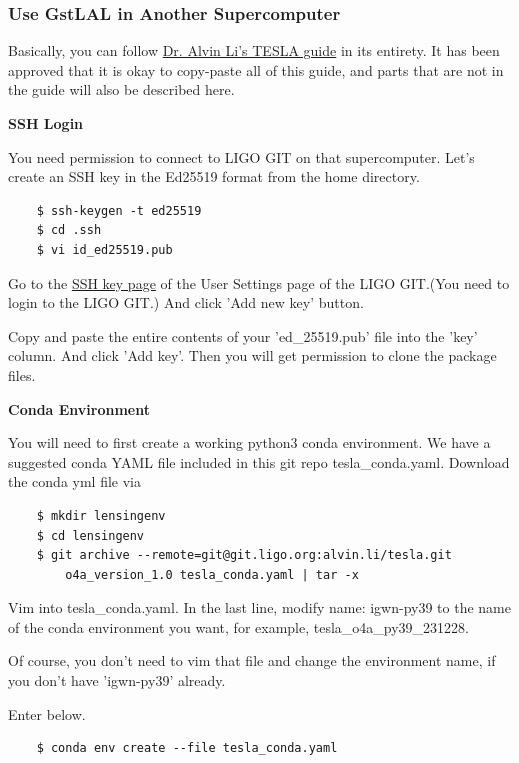 \subsubsection{Use GstLAL in Another Supercomputer}

Basically, you can follow \href{https://git.ligo.org/alvin.li/tesla/-/tree/o4a_version_1.0}{Dr. Alvin Li's TESLA guide} in its entirety. It has been approved that it is okay to copy-paste all of this guide, and parts that are not in the guide will also be described here.

\textbf{SSH Login}

You need permission to connect to LIGO GIT on that supercomputer. Let's create an SSH key in the Ed25519 format from the home directory.

\begin{verbatim}
    $ ssh-keygen -t ed25519
    $ cd .ssh
    $ vi id_ed25519.pub
\end{verbatim}

Go to the \href{https://git.ligo.org/-/user_settings/ssh_keys}{SSH key page} of the User Settings page of the LIGO GIT.(You need to login to the LIGO GIT.) And click 'Add new key' button.

Copy and paste the entire contents of your 'ed\_25519.pub' file into the 'key' column. And click 'Add key'. Then you will get permission to clone the package files.

\textbf{Conda Environment}

You will need to first create a working python3 conda environment. We have a suggested conda YAML file included in this git repo tesla\_conda.yaml. Download the conda yml file via

\begin{verbatim}
    $ mkdir lensingenv
    $ cd lensingenv
    $ git archive --remote=git@git.ligo.org:alvin.li/tesla.git
        o4a_version_1.0 tesla_conda.yaml | tar -x
\end{verbatim}

Vim into tesla\_conda.yaml. In the last line, modify name: igwn-py39 to the name of the conda environment you want, for example, tesla\_o4a\_py39\_231228.

Of course, you don't need to vim that file and change the environment name, if you don't have 'igwn-py39' already.

Enter below.

\begin{verbatim}
    $ conda env create --file tesla_conda.yaml
\end{verbatim}

